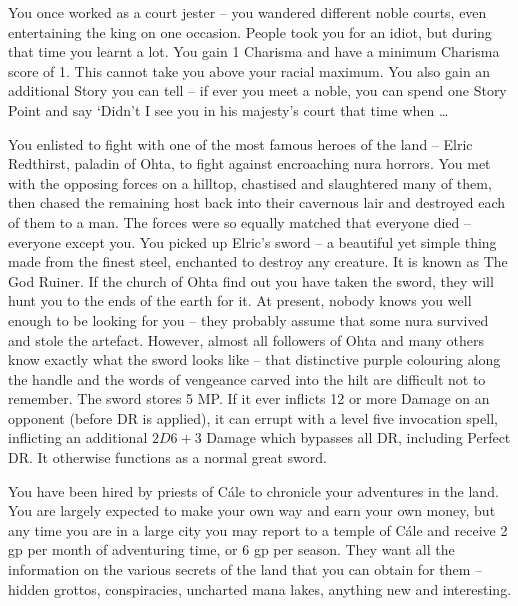 \begin{list}{\addtocounter{list}{1}\textbf{:}}{\raggedleft}
\item{ You once worked as a court jester -- you wandered different noble courts, even entertaining the king on one occasion.  People took you for an idiot, but during that time you learnt a lot.  You gain 1 Charisma and have a minimum Charisma score of 1.  This cannot take you above your racial maximum.  You also gain an additional Story you can tell -- if ever you meet a noble, you can spend one Story Point and say `Didn't I see you in his majesty's court that time when \ldots}

\item{You enlisted to fight with one of the most famous heroes of the land -- Elric Redthirst, paladin of Ohta, to fight against encroaching nura horrors.  You met with the opposing forces on a hilltop, chastised and slaughtered many of them, then chased the remaining host back into their cavernous lair and destroyed each of them to a man.  The forces were so equally matched that everyone died -- everyone except you. You picked up Elric's sword -- a beautiful yet simple thing made from the finest steel, enchanted to destroy any creature.  It is known as The God Ruiner.  If the church of Ohta find out you have taken the sword, they will hunt you to the ends of the earth for it.  At present, nobody knows you well enough to be looking for you -- they probably assume that some nura survived and stole the artefact.  However, almost all followers of Ohta and many others know exactly what the sword looks like -- that distinctive purple colouring along the handle and the words of vengeance carved into the hilt are difficult not to remember.  The sword stores 5 MP.  If it ever inflicts 12 or more Damage on an opponent (before DR is applied), it can errupt with a level five invocation spell, inflicting an additional $2D6+3$ Damage which bypasses all DR, including Perfect DR.  It otherwise functions as a normal great sword.}

\item{You have been hired by priests of C\'{a}le to chronicle your adventures in the land.  You are largely expected to make your own way and earn your own money, but any time you are in a large city you may report to a temple of C\'{a}le and receive 2 gp per month of adventuring time, or 6 gp per season.  They want all the information on the various secrets of the land that you can obtain for them -- hidden grottos, conspiracies, uncharted mana lakes, anything new and interesting.}


\end{list}
